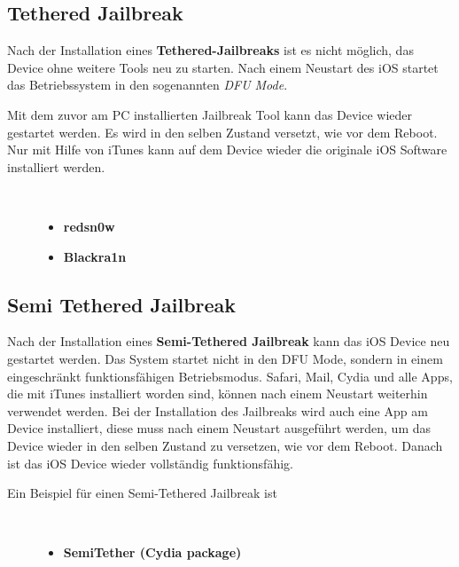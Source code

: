 \subsection{Tethered Jailbreak}
\label{sec:JBTethered}
Nach der Installation eines \textbf{Tethered-Jailbreaks} ist es nicht möglich, das Device ohne weitere Tools neu zu starten. Nach einem Neustart des iOS startet das Betriebssystem in den sogenannten \textit{\glqq DFU Mode\grqq{}}. \par
Mit dem zuvor am PC installierten Jailbreak Tool kann das Device wieder gestartet werden. Es wird in den selben Zustand versetzt, wie vor dem Reboot. Nur mit Hilfe von iTunes kann auf dem Device wieder die originale iOS Software installiert werden. 
\newpage
\begin{description}
     \item[\parbox{\textwidth} {Nachfolgend werden zwei häufig verwendete Tethered-Jailbreak Tools angeführt}]~\par
	\begin{itemize}
            \item \textbf{redsn0w}
            \item \textbf{Blackra1n}
    \end{itemize}
\end{description} 

\subsection{Semi Tethered Jailbreak}
\label{sec:JBSemiTethered}

Nach der Installation eines \textbf{Semi-Tethered Jailbreak} kann das iOS Device neu gestartet werden. Das System startet nicht in den DFU Mode, sondern in einem eingeschränkt funktionsfähigen Betriebsmodus. Safari, Mail, Cydia und alle Apps, die mit iTunes installiert worden sind, können nach einem Neustart weiterhin verwendet werden. Bei der Installation des Jailbreaks wird auch eine App am Device installiert, diese muss nach einem Neustart ausgeführt werden, um das Device wieder in den selben Zustand zu versetzen, wie vor dem Reboot. Danach ist das iOS Device wieder vollständig funktionsfähig.

\begin{description}
    \item[Ein Beispiel für einen Semi-Tethered Jailbreak ist]~\par
	\begin{itemize}
        \item \textbf{SemiTether (Cydia package)}
    \end{itemize}
\end{description} 

